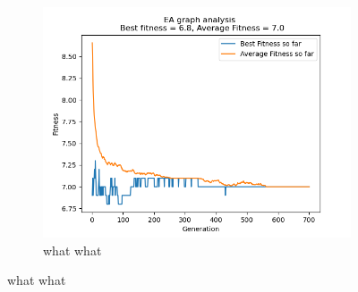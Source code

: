 \documentclass[conference,compsoc]{IEEEtran}
\begin{document}
\begin{figure}[h]
\begin{subfigure}{0.34\textwidth}
  \end{subfigure}
  \begin{subfigure}{0.34\textwidth}
    \includegraphics[width=\linewidth]{../Results/_11_Random_Truncation_100_50_700.png}
    \caption{what what}
  \end{subfigure}
  \label{fig:graphs1}
\end{figure}
\end{document}
